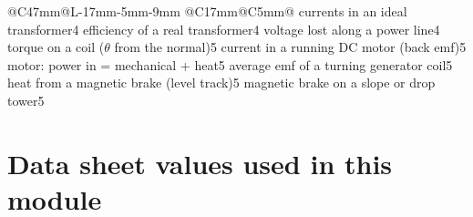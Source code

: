 {\begin{longtable}{@{}C{47mm}@{\hspace{3mm}}L{\dimexpr\linewidth-47mm-17mm-5mm-9mm\relax}%
    @{\hspace{3mm}}C{17mm}@{\hspace{3mm}}C{5mm}@{}}
    {currents in an ideal transformer}{4}
    {efficiency of a real transformer}{4}
    {voltage lost along a power line}{4}
  \essfsnext
    {torque on a coil ($\theta$ from the normal)}{5}
    {current in a running DC motor (back emf)}{5}
    {motor: power in = mechanical + heat}{5}
    {average emf of a turning generator coil}{5}
    {heat from a magnetic brake (level track)}{5}
    {magnetic brake on a slope or drop tower}{5}
\end{longtable}}

\section*{Data sheet values used in this module}

